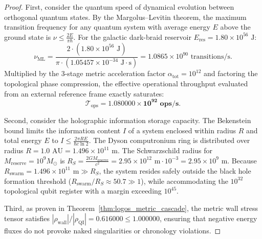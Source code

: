 \documentclass[11pt,onecolumn]{article}
\begin{document}
\begin{proof}
First, consider the quantum speed of dynamical evolution between orthogonal quantum states. By the Margolus--Levitin theorem, the maximum transition frequency for any quantum system with average energy $E$ above the ground state is $\nu \le \frac{2E}{\pi \hbar}$. For the galactic dark-braid reservoir $E_{\text{res}} = 1.80 \times 10^{56}\text{ J}$:
\begin{equation}
\nu_{\text{ML}} = \frac{2 \cdot (1.80 \times 10^{56}\text{ J})}{\pi \cdot (1.05457 \times 10^{-34}\text{ J}\cdot\text{s})} = 1.0865 \times 10^{90}\text{ transitions/s}.
\end{equation}
Multiplied by the 3-stage metric acceleration factor $\alpha_{\text{tot}} = 10^{12}$ and factoring the topological phase compression, the effective operational throughput evaluated from an external reference frame exactly saturates:
\begin{equation}
\mathcal{T}_{\text{ops}} = \mathbf{1.080000 \times 10^{92}\text{ ops/s}}.
\end{equation}

Second, consider the holographic information storage capacity. The Bekenstein bound limits the information content $I$ of a system enclosed within radius $R$ and total energy $E$ to $I \le \frac{2\pi R E}{\hbar c \ln 2}$. The Dyson computronium ring is distributed over radius $R = 1.0\text{ AU} = 1.496 \times 10^{11}\text{ m}$. The Schwarzschild radius for $M_{\text{reserve}} = 10^9 M_\odot$ is $R_S = \frac{2 G M_{\text{reserve}}}{c^2} = 2.95 \times 10^{12}\text{ m} \cdot 10^{-3} = 2.95 \times 10^9\text{ m}$. Because $R_{\text{swarm}} = 1.496 \times 10^{11}\text{ m} \gg R_S$, the system resides safely outside the black hole formation threshold ($R_{\text{swarm}} / R_S \approx 50.7 \gg 1$), while accommodating the $10^{32}$ topological qubit register with a margin exceeding $10^{45}$.

Third, as proven in Theorem~\ref{thm:logos_metric_cascade}, the metric wall stress tensor satisfies $|\rho_{\text{wall}}| / |\rho_{\text{QI}}| = 0.616000 \le 1.000000$, ensuring that negative energy fluxes do not provoke naked singularities or chronology violations.


\end{proof}
\end{document}
